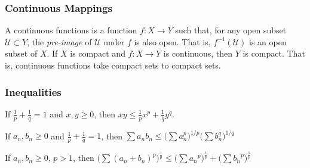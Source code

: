 \documentclass[crop=false,class=article,oneside]{standalone}
\begin{document}
        \subsubsection{Continuous Mappings}
            A continuous functions is a function $f:X\rightarrow{Y}$
            such that, for any open subset $\mathcal{U}\subset{Y}$,
            the \textit{pre-image} of $\mathcal{U}$ under $f$ is
            also open. That is, $f^{-1}(\mathcal{U})$ is an open subset
            of $X$. If $X$ is compact and $f:X\rightarrow{Y}$ is
            continuous, then $Y$ is compact. That is, continuous
            functions take compact sets to compact sets.
        \subsubsection{Inequalities}
            \begin{theorem}[Young]
                If $\frac{1}{p}+\frac{1}{q}=1$ and $x,y\geq{0}$, then
                $xy\leq\frac{1}{p}x^{p}+\frac{1}{q}y^{q}$.
            \end{theorem}
            \begin{theorem}[H\"{o}lder]
                If $a_{n},b_{n}\geq{0}$ and
                $\frac{1}{p}+\frac{1}{q}=1$, then
                $\sum{a_{n}b_{n}}\leq%
                 \big(\sum{a_{n}^{p}}\big)^{1/p}%
                 \big(\sum{b_{n}^{q}}\big)^{1/q}$
            \end{theorem}
            \begin{theorem}[Minkowski]
                If $a_{n},b_{n}\geq{0}$, $p>1$, then
                $\big(\sum(a_{n}+b_{n})^{p}\big)^{\frac{1}{p}}\leq%
                 \big(\sum{a_{n}}^{p}\big)^{\frac{1}{p}}+%
                 \big(\sum{b_{n}}^{p}\big)^{\frac{1}{p}}$
            \end{theorem}
\end{document}

